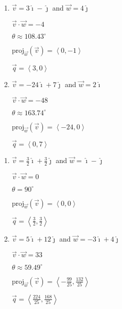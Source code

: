 \begin{multicols}{2} \raggedcolumns 
\begin{enumerate}
\setcounter{enumi}{\value{HW}}


\item $\vec{v} =3\hat{\imath} - \hat{\jmath}$ and $\vec{w} = 4\hat{\jmath}$

 $\vec{v} \cdot \vec{w} = -4$

 $\theta \approx 108.43^{\circ}$ 

 $\text{proj}_{\vec{w}}(\vec{v}) = \left\langle 0,-1 \right\rangle$

 $\vec{q} = \left\langle 3,0 \right\rangle$

\vfill

\item $\vec{v} = -24\hat{\imath} + 7\hat{\jmath} $ and $\vec{w} = 2\hat{\imath}$

 $\vec{v} \cdot \vec{w} = -48$

 $\theta \approx 163.74^{\circ}$ 

 $\text{proj}_{\vec{w}}(\vec{v}) = \left\langle -24,0 \right\rangle$

 $\vec{q} = \left\langle 0,7\right\rangle$
 
\setcounter{HW}{\value{enumi}}
\end{enumerate}
\end{multicols}



\begin{multicols}{2} \raggedcolumns 
\begin{enumerate}
\setcounter{enumi}{\value{HW}}


\item  $\vec{v} =\frac{3}{2} \hat{\imath} + \frac{3}{2} \hat{\jmath}$ and $\vec{w} = \hat{\imath} - \hat{\jmath}$

 $\vec{v} \cdot \vec{w} = 0$

 $\theta = 90^{\circ}$ 

 $\text{proj}_{\vec{w}}(\vec{v}) = \left\langle 0,0 \right\rangle$

 $\vec{q} = \left\langle \frac{3}{2},\frac{3}{2} \right\rangle$

\vfill

\item $\vec{v} = 5\hat{\imath} + 12\hat{\jmath}$ and $\vec{w} = -3\hat{\imath} + 4\hat{\jmath} $

 $\vec{v} \cdot \vec{w} = 33$

 $\theta \approx  59.49^{\circ}$ 

 $\text{proj}_{\vec{w}}(\vec{v}) = \left\langle -\frac{99}{25}, \frac{132}{25} \right\rangle$

 $\vec{q} = \left\langle \frac{224}{25},\frac{168}{25} \right\rangle$
 
\setcounter{HW}{\value{enumi}}
\end{enumerate}
\end{multicols}


